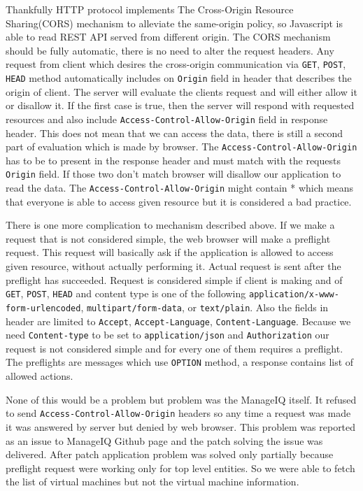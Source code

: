 Thankfully HTTP protocol implements The Cross-Origin Resource Sharing(CORS)\cite{cors} mechanism to alleviate the same-origin policy, so Javascript is able to read REST API served from different origin. The CORS mechanism should be fully automatic, there is no need to alter the request headers. Any request from client which desires the cross-origin communication via \texttt{GET}, \texttt{POST}, \texttt{HEAD} method automatically includes on \texttt{Origin} field in header that describes the origin of client. The server will evaluate the clients request and will either allow it or disallow it. If the first case is true, then the server will respond with requested resources and also include \texttt{Access-Control-Allow-Origin} field in response header. This does not mean that we can access the data, there is still a second part of evaluation which is made by browser. The \texttt{Access-Control-Allow-Origin} has to be to present in the response header and must match with the requests \texttt{Origin} field. If those two don't match browser will disallow our application to read the data. The \texttt{Access-Control-Allow-Origin} might contain * which means that everyone is able to access given resource but it is considered a bad practice.

There is one more complication to mechanism described above. If we make a request that is not considered simple, the web browser will make a preflight request. This request will basically ask if the application is allowed to access given resource, without actually performing it. Actual request is sent after the preflight has succeeded. Request is considered simple if client is making and of \texttt{GET}, \texttt{POST}, \texttt{HEAD} and content type is one of the following \texttt{application/x-www-form-urlencoded}, \texttt{multipart/form-data}, or \texttt{text/plain}. Also the fields in header are limited to \texttt{Accept}, \texttt{Accept-Language}, \texttt{Content-Language}. Because we need \texttt{Content-type} to be set to \texttt{application/json} and \texttt{Authorization} our request is not considered simple and for every one of them requires a preflight. The preflights are messages which use \texttt{OPTION} method, a response contains list of allowed actions.

None of this would be a problem but problem was the ManageIQ itself. It refused to send \texttt{Access-Control-Allow-Origin} headers so any time a request was made it was answered by server but denied by web browser. This problem was reported as an issue to ManageIQ Github page and the patch solving the issue was delivered. After patch application problem was solved only partially because preflight request were working only for top level entities. So we were able to fetch the list of virtual machines but not the virtual machine information.

